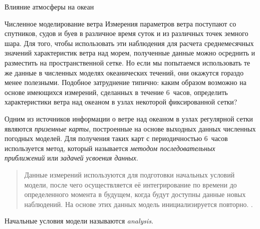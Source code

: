 \begin{chapter}{Влияние атмосферы на океан}
\begin{section}{Численное моделирование ветра}\label{sec:wndcalc}
Измерения параметров ветра поступают со спутников, судов и буев в различное 
время суток и из различных точек земного шара. Для того, чтобы использовать 
эти наблюдения для расчета среднемесячных значений характеристик ветра над 
морем, полученные данные можно осреднить и разместить на пространственной сетке. 
Но если мы попытаемся использовать те же данные в численных моделях 
океанических течений, они окажутся гораздо менее полезными. Подобное 
затруднение типично: каким образом возможно на основе имеющихся измерений,
сделанных в течение 6~часов, определить характеристики ветра над океаном
в узлах некоторой фиксированной сетки?
%

Одним из источников информации о ветре над океаном в узлах регулярной сетки
являются \emph{приземные карты}, построенные на основе выходных данных 
численных погодных моделей. Для получения таких карт с периодичностью 6~часов
используется метод, который называется 
\emph{методом последовательных приближений} 
или \emph{задачей усвоения данных}.
\begin{quotation} 
Данные измерений используются для подготовки начальных условий модели, 
после чего осуществляется её интегрирование по времени до определенного 
момента в будущем, когда будут доступны данные новых наблюдений. 
На основе этих данных модель инициализируется повторно. \cite[67]{Bennett:1992}.
\end{quotation}
Начальные условия модели называются \textit{analysis}.
%


\end{section}
\end{chapter}
